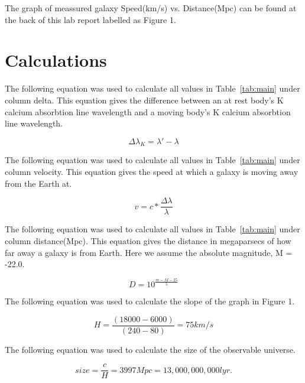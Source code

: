 \documentclass{article}
\begin{document}
The graph of meassured galaxy Speed(km/s) vs. Distance(Mpc) can be found at the back
of this lab report labelled as Figure 1.


\section{Calculations}
\label{sec:calc}

The following equation was used to calculate all values in Table~\ref{tab:main} under
column delta. This equation gives the difference between an at rest body's K calcium
absorbtion line wavelength and a moving body's K calcium absorbtion line wavelength.

\begin{equation}
\label{eq:delta}
\Delta \lambda_{K} = \lambda' - \lambda
\end{equation}

The following equation was used to calculate all values in Table~\ref{tab:main} under
column velocity. This equation gives the speed at which a galaxy is moving away
from the Earth at.

\begin{equation}
\label{eq:vel}
v = c * \frac{\Delta \lambda}{\lambda}
\end{equation}

The following equation was used to calculate all values in Table~\ref{tab:main} under
column distance(Mpc). This equation gives the distance in megaparsecs of how far away
a galaxy is from Earth. Here we assume the absolute magnitude, M = -22.0.

\begin{equation}
\label{eq:dist}
D = 10^{\frac{m-M-25}{5}}
\end{equation}

The following equation was used to calculate the slope of the graph in Figure 1.

\begin{equation}
\label{eq:slope}
H = \frac{(18000 - 6000)}{(240 - 80)} = 75km/s
\end{equation}

The following equation was used to calculate the size of the observable universe.

\begin{equation}
\label{eq:size}
size = \frac{c}{H} = 3997Mpc = 13,000,000,000 lyr.
\end{equation}
\end{document}
